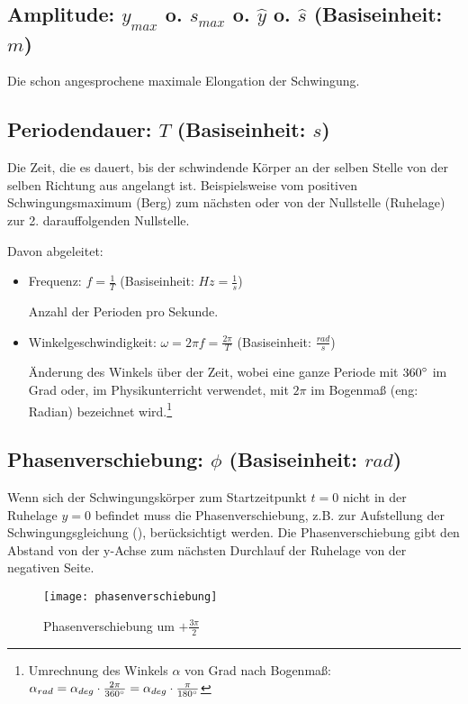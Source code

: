 \subsection[Amplitude]{Amplitude: $y_{max}$ o. $s_{max}$ o. $\hat{y}$ o. $\hat{s}$ (Basiseinheit: $m$)}

Die schon angesprochene maximale Elongation der Schwingung.


\subsection[Periodendauer]{Periodendauer: $T$ (Basiseinheit: $s$)}
	
Die Zeit, die es dauert, bis der schwindende Körper an der selben Stelle von der selben Richtung aus angelangt ist. Beispielsweise vom positiven Schwingungsmaximum (\glqq Berg\grqq) zum nächsten oder von der Nullstelle (\glqq Ruhelage\grqq) zur 2. darauffolgenden Nullstelle.

Davon abgeleitet:
\begin{itemize}
	\item Frequenz: $f=\frac{1}{T}$ (Basiseinheit: $Hz=\frac{1}{s}$)
	
	Anzahl der Perioden pro Sekunde.
	\item Winkelgeschwindigkeit: $\omega=2 \pi f=\frac{2 \pi}{T}$ (Basiseinheit: $\frac{rad}{s}$)
		
	Änderung des Winkels über der Zeit, wobei eine ganze Periode mit $360 \degree$ im Grad oder, im Physikunterricht verwendet, mit $2 \pi$ im Bogenmaß (eng: \glqq Radian\grqq) bezeichnet wird.\footnote{Umrechnung des Winkels $\alpha$ von Grad nach Bogenmaß: $\alpha_{rad} = \alpha_{deg} \cdot \frac{2\pi}{360 \degree} = \alpha_{deg} \cdot \frac{\pi}{180 \degree} $}
\end{itemize}


\subsection[Phasenverschiebung]{Phasenverschiebung: $\phi$ (Basiseinheit: $rad$)}
	
Wenn sich der Schwingungskörper zum Startzeitpunkt $t=0$ nicht in der Ruhelage $y=0$ befindet muss die Phasenverschiebung, z.B. zur Aufstellung der Schwingungsgleichung (), berücksichtigt werden. Die Phasenverschiebung gibt den Abstand von der y-Achse zum nächsten Durchlauf der Ruhelage von der negativen Seite.

	\begin{figure}[!h] \label{phasenverschiebung}
	
		\centering
		\texttt{[image: phasenverschiebung]}
		\caption{Phasenverschiebung um $+\frac{3\pi}{2}$}
	
	\end{figure}

